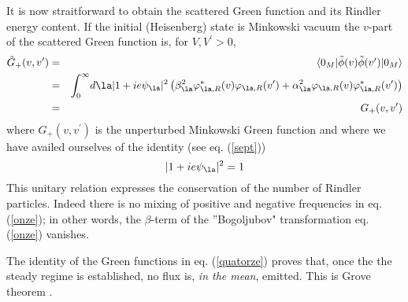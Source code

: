 \documentclass[12pt]{article}
\begin{document}
It is now straitforward to obtain the  scattered Green function and its
Rindler energy content. If the initial (Heisenberg) state is Minkowski vacuum
the $v$-part of the scattered Green function is, for $V,V^\prime > 0$,
\begin{eqnarray}
\tilde G_+(v,v^\prime) &=& \expect{0_M}{\tilde  \phi(v)
 \tilde \phi(v^\prime)}{0_M}\nonumber\\ &=&  \int_0^{\infty}\! d\la
 |1+ ie\psi _{ \la}|^2 \left(
\beta_{\la}^2
 \varphi_{\la,R}^*(v)  \varphi_{\la,R}(v^\prime) +
\alpha_{\la}^2
 \varphi_{\la,R}(v)  \varphi_{\la,R}^*(v^\prime) \right)
\nonumber\\
&=& G_+(v,v^\prime)
\label{quatorze}
\end{eqnarray}
where $G_+(v,v^\prime)$ is the unperturbed Minkowski Green function and
where we have availed ourselves of the identity (see eq. (\ref{sept}))
\begin{equation}
|1+ ie\psi _{ \la}|^2 = 1
\label{quinze}
\end{equation}
This unitary
relation
expresses the conservation of the number of Rindler
particles.
Indeed there is no mixing of positive and negative frequencies in
eq. (\ref{onze}); in other words, the $ \beta$-term of the ''Bogoljubov"
transformation eq. (\ref{onze})
vanishes.

The identity of the Green functions in eq. (\ref{quatorze}) proves that, once
the the steady regime is established,
no flux
is, {\it
 in the
mean},
emitted.
This is
Grove theorem \cite{Grove} \cite{RSG}.
\end{document}
